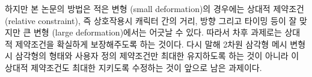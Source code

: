 \documentclass[11pt,a4paper,oneside,draft]{report}
\begin{document}
하지만 본 논문의 방법은 적은 변형 (small deformation)의 경우에는 상대적
제약조건 (relative constraint), 즉 상호작용시 캐릭터 간의 거리, 방향 그리고
타이밍 등이 잘 맞지만 큰 변형 (large deformation)에서는 어긋날 수 있다. 따라서
차후 과제로는 상대적 제약조건을 확실하게 보장해주도록 하는 것이다. 다시 말해
2차원 삼각형 메시 변형시 삼각형의 형태와 사용자 정의 제약조건만 최대한
유지하도록 하는 것이 아니라 이 상대적 제약조건도 최대한 지키도록 수정하는 것이
앞으로 남은 과제이다.

\printbibliography
\end{document}
